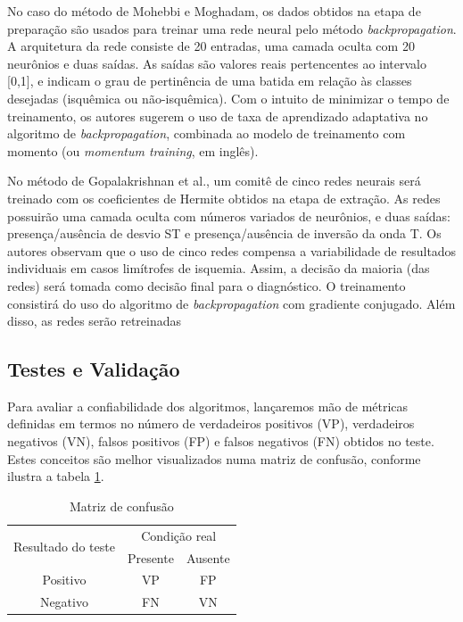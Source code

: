 No caso do método de Mohebbi e Moghadam, os dados obtidos na etapa de preparação são usados para treinar uma rede neural pelo método \emph{backpropagation}. A arquitetura da rede consiste de 20 entradas, uma camada oculta com 20 neurônios e duas saídas. As saídas são valores reais pertencentes ao intervalo [0,1], e indicam o grau de pertinência de uma batida em relação às classes desejadas (isquêmica ou não-isquêmica). Com o intuito de minimizar o tempo de treinamento, os autores sugerem o uso de taxa de aprendizado adaptativa no algoritmo de \emph{backpropagation}, combinada ao modelo de treinamento com momento (ou \emph{momentum training}, em inglês).

No método de Gopalakrishnan et al., um comitê de cinco redes neurais será treinado com os coeficientes de Hermite obtidos na etapa de extração. As redes possuirão uma camada oculta com números variados de neurônios, e duas saídas: presença/ausência de desvio ST e presença/ausência de inversão da onda T. Os autores observam que o uso de cinco redes compensa a variabilidade de resultados individuais em casos limítrofes de isquemia. Assim, a decisão da maioria (das redes) será tomada como decisão final para o diagnóstico. O treinamento consistirá do uso do algoritmo de \emph{backpropagation} com gradiente conjugado. Além disso, as redes serão retreinadas 

\subsection{Testes e Validação}
Para avaliar a confiabilidade dos algoritmos, lançaremos mão de métricas definidas em termos no número de verdadeiros positivos (VP), verdadeiros negativos (VN), falsos positivos (FP) e falsos negativos (FN) obtidos no teste. Estes conceitos são melhor visualizados numa matriz de confusão, conforme ilustra a tabela \ref{tab:confusion_matrix}.

\begin{table}[ht] 
    \caption{Matriz de confusão}
    \centering
    \begin{tabular}{ccc}
        \toprule
        \multirow{2}{2cm}{Resultado do teste} &
        \multicolumn{2}{c}{Condição real} \\
        \cmidrule{2-3}
        & Presente & Ausente \\ 
        \midrule
        Positivo & VP & FP \\
        \midrule
        Negativo & FN & VN \\
        \bottomrule
    \end{tabular} 
    \label{tab:confusion_matrix}
\end{table} 

